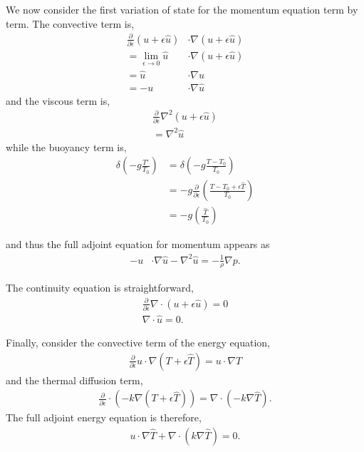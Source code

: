 We now consider the first variation of state for the momentum equation
term by term. The convective term is, 
\begin{align}
 \frac{\partial}{\partial \epsilon} (u + \epsilon \hat u) &\cdot \nabla
  (u + \epsilon \hat u) \\
 = \lim_{\epsilon \to 0} \hat u &\cdot \nabla (u + \epsilon \hat u) \\
 = \hat u & \cdot \nabla u \\
 = - u &\cdot \nabla \hat u
\end{align}
and the viscous term is, 
\begin{align}
 \frac{\partial}{\partial \epsilon} \nabla^2 (u + \epsilon \hat u) \\
 = \nabla^2 \hat u
\end{align}
while the buoyancy term is, 
\begin{align}
 \delta \left(-g \frac{T'}{T_0}\right) &= \delta \left( -g
 \frac{T-T_0}{T_0} \right) \\
 &= -g \frac{\partial}{\partial \epsilon} \left( \frac{T-T_0+\epsilon
 \hat T}{T_0} \right) \\
 &= -g \left( \frac{\hat T}{T_0} \right) 
\end{align}


and thus the full adjoint equation for momentum appears as
\begin{align}
 - u &\cdot \nabla \hat u - \nabla^2 \hat u = -\frac{1}{\rho} \nabla p. 
\label{eq_adjmom}
\end{align}

The continuity equation is straightforward, 
\begin{align}
 \frac{\partial}{\partial \epsilon} \nabla \cdot (u + \epsilon \hat
 u) = 0 \\
\nabla \cdot \hat u = 0.
\label{eq_adjcont}
\end{align}

Finally, consider the convective term of the energy equation, 
\begin{align}
 \frac{\partial}{\partial \epsilon} u \cdot \nabla (T + \epsilon \hat T)
 = u \cdot \nabla \hat T
\end{align}
and the thermal diffusion term, 
\begin{align}
 \frac{\partial}{\partial \epsilon} \cdot (-k \nabla (T + \epsilon \hat
 T)) = \nabla \cdot (-k \nabla \hat T).
\end{align}
The full adjoint energy equation is therefore, 
\begin{align}
 u \cdot \nabla \hat T + \nabla \cdot (k \nabla \hat T) =0.
\label{eq_adjen}
\end{align}

